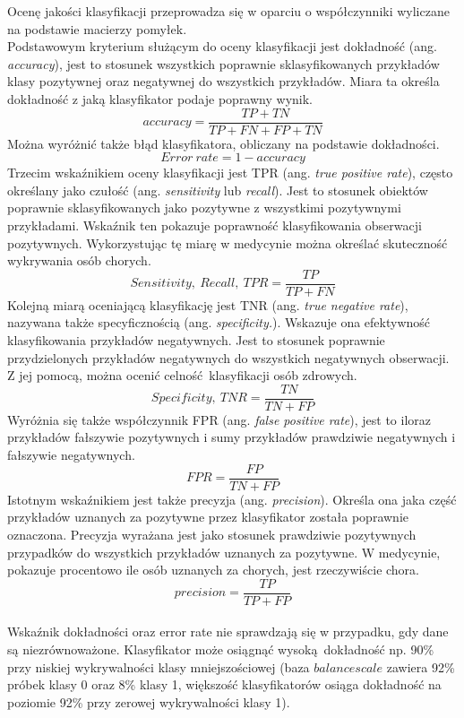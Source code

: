 Ocenę jakości klasyfikacji przeprowadza się w oparciu o współczynniki wyliczane na podstawie macierzy pomyłek.\\
Podstawowym kryterium służącym do oceny klasyfikacji jest dokładność (ang. \textit{accuracy}), jest to stosunek wszystkich poprawnie sklasyfikowanych przykładów klasy pozytywnej oraz negatywnej do wszystkich przykładów. Miara ta określa dokładność z jaką klasyfikator podaje poprawny wynik.
\[accuracy = \frac{TP + TN}{TP + FN + FP + TN}\]
Można wyróżnić także błąd klasyfikatora, obliczany na podstawie dokładności.
\[Error\ rate = 1 - accuracy\label{error_rate}\]
Trzecim wskaźnikiem oceny klasyfikacji jest TPR (ang. \textit{true positive rate}), często określany jako czułość (ang. \textit{sensitivity} lub \textit{recall}). Jest to stosunek obiektów poprawnie sklasyfikowanych jako pozytywne z wszystkimi pozytywnymi przykładami. Wskaźnik ten pokazuje poprawność klasyfikowania obserwacji pozytywnych. Wykorzystując tę miarę w medycynie można określać skuteczność wykrywania osób chorych.
\[Sensitivity,\ Recall,\ TPR = \frac{TP}{TP + FN}\]
Kolejną miarą oceniającą klasyfikację jest TNR (ang. \textit{true negative rate}), nazywana także specyficznością (ang. \textit{specificity.}). Wskazuje ona efektywność klasyfikowania przykładów negatywnych. Jest to stosunek poprawnie przydzielonych przykładów negatywnych do wszystkich negatywnych obserwacji. Z jej pomocą, można ocenić celność klasyfikacji osób zdrowych.
\[Specificity,\ TNR = \frac{TN}{TN + FP}\]
Wyróżnia się także współczynnik FPR (ang. \textit{false positive rate}), jest to iloraz przykładów fałszywie pozytywnych i sumy przykładów prawdziwie negatywnych i fałszywie negatywnych.
\[FPR = \frac{FP}{TN + FP}\]
Istotnym wskaźnikiem jest także precyzja (ang. \textit{precision}). Określa ona jaka część przykładów uznanych za pozytywne przez klasyfikator została poprawnie oznaczona. Precyzja wyrażana jest jako stosunek prawdziwie pozytywnych przypadków do wszystkich przykładów uznanych za pozytywne. W medycynie, pokazuje procentowo ile osób uznanych za chorych, jest rzeczywiście chora.
\[precision = \frac{TP}{TP + FP}\]\\
Wskaźnik dokładności oraz error rate nie sprawdzają się w przypadku, gdy dane są niezrównoważone. Klasyfikator może osiągnąć wysoką dokładność np. 90\% przy niskiej wykrywalności klasy mniejszościowej (baza $balance scale$ zawiera 92\% próbek klasy 0 oraz 8\% klasy 1, większość klasyfikatorów osiąga dokładność na poziomie 92\% przy zerowej wykrywalności klasy 1).
